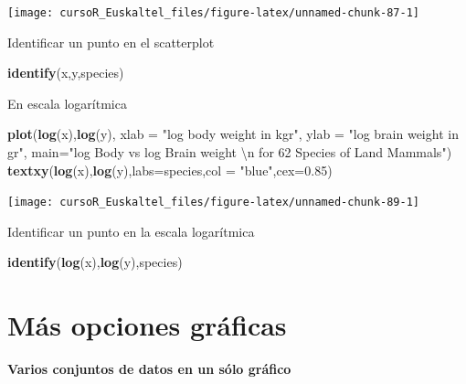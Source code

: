\documentclass[]{book}
\newenvironment{Shaded}{\begin{snugshade}}{\end{snugshade}}
\newcommand{\KeywordTok}[1]{\textcolor[rgb]{0.13,0.29,0.53}{\textbf{#1}}}
\newcommand{\DataTypeTok}[1]{\textcolor[rgb]{0.13,0.29,0.53}{#1}}
\newcommand{\FloatTok}[1]{\textcolor[rgb]{0.00,0.00,0.81}{#1}}
\newcommand{\CharTok}[1]{\textcolor[rgb]{0.31,0.60,0.02}{#1}}
\newcommand{\StringTok}[1]{\textcolor[rgb]{0.31,0.60,0.02}{#1}}
\newcommand{\NormalTok}[1]{#1}
\begin{document}
\begin{center}\texttt{[image: cursoR\_Euskaltel\_files/figure-latex/unnamed-chunk-87-1]} \end{center}

Identificar un punto en el scatterplot

\begin{Shaded}
\begin{Highlighting}[]
\KeywordTok{identify}\NormalTok{(x,y,species)}
\end{Highlighting}
\end{Shaded}

En escala logarítmica

\begin{Shaded}
\begin{Highlighting}[]
\KeywordTok{plot}\NormalTok{(}\KeywordTok{log}\NormalTok{(x),}\KeywordTok{log}\NormalTok{(y), }\DataTypeTok{xlab =} \StringTok{"log body weight in kgr"}\NormalTok{, }\DataTypeTok{ylab =} \StringTok{"log brain weight in gr"}\NormalTok{, }
     \DataTypeTok{main=}\StringTok{"log Body vs log Brain weight }\CharTok{\textbackslash{}n}\StringTok{ for 62 Species of Land Mammals"}\NormalTok{)}
\KeywordTok{textxy}\NormalTok{(}\KeywordTok{log}\NormalTok{(x),}\KeywordTok{log}\NormalTok{(y),}\DataTypeTok{labs=}\NormalTok{species,}\DataTypeTok{col =} \StringTok{"blue"}\NormalTok{,}\DataTypeTok{cex=}\FloatTok{0.85}\NormalTok{) }
\end{Highlighting}
\end{Shaded}

\begin{center}\texttt{[image: cursoR\_Euskaltel\_files/figure-latex/unnamed-chunk-89-1]} \end{center}

Identificar un punto en la escala logarítmica

\begin{Shaded}
\begin{Highlighting}[]
\KeywordTok{identify}\NormalTok{(}\KeywordTok{log}\NormalTok{(x),}\KeywordTok{log}\NormalTok{(y),species)}
\end{Highlighting}
\end{Shaded}

\section{Más opciones gráficas}\label{mas-opciones-graficas}

\textbf{Varios conjuntos de datos en un sólo gráfico}
\end{document}
